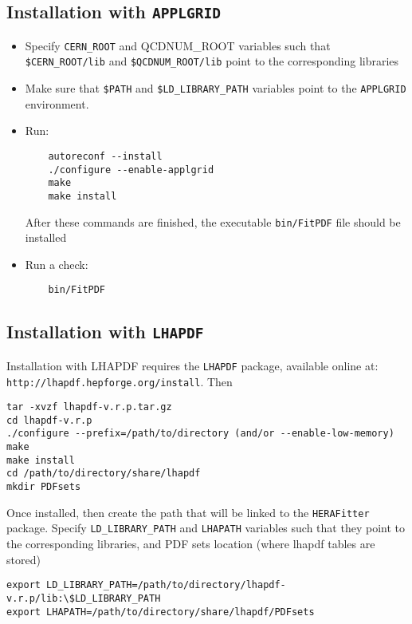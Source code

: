 \subsection{Installation with {\tt APPLGRID}}
\begin{itemize}
\item
 Specify {\tt CERN\_ROOT} and {QCDNUM\_ROOT} variables such that 
     {\tt \$CERN\_ROOT/lib}  and {\tt \$QCDNUM\_ROOT/lib}
 point to the corresponding libraries
\item Make sure that {\tt \$PATH} and {\tt \$LD\_LIBRARY\_PATH} 
variables point to the {\tt APPLGRID} environment.
\item Run:
\begin{verbatim}
    autoreconf --install
    ./configure --enable-applgrid
    make 
    make install
\end{verbatim}
After these commands are finished, the executable {\tt bin/FitPDF} 
file should be installed
\item  Run a check:
\begin{verbatim}
    bin/FitPDF 
\end{verbatim}
\end{itemize}
\subsection{Installation with {\tt LHAPDF}}\label{sec:install_lhapdf}

Installation with LHAPDF requires the {\tt LHAPDF} package, available online at:\\
{\tt http://lhapdf.hepforge.org/install}.
Then
\begin{verbatim}
tar -xvzf lhapdf-v.r.p.tar.gz
cd lhapdf-v.r.p
./configure --prefix=/path/to/directory (and/or --enable-low-memory)
make
make install
cd /path/to/directory/share/lhapdf
mkdir PDFsets
\end{verbatim}

Once installed, then create the path that will be linked to the {\tt HERAFitter} package.
 Specify {\tt LD\_LIBRARY\_PATH} 
     and {\tt LHAPATH} variables such that they
 point to the corresponding libraries, and PDF sets location (where lhapdf tables are stored)
\begin{verbatim}
export LD_LIBRARY_PATH=/path/to/directory/lhapdf-v.r.p/lib:\$LD_LIBRARY_PATH
export LHAPATH=/path/to/directory/share/lhapdf/PDFsets
\end{verbatim}



